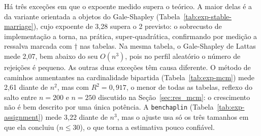 



Há três exceções em que o expoente medido supera o teórico. A maior delas é a da
variante orientada a objetos do Gale-Shapley
(Tabela~\ref{tab:exp-stable-marriage}), cujo expoente de 3{,}28 supera o 2
previsto: o sobrecusto de implementação a torna, na prática, super-quadrática,
confirmando por medição a ressalva marcada com † nas tabelas. Na mesma tabela, o
Gale-Shapley de Lattas mede 2{,}07, bem abaixo do seu $O(n^3)$, pois no perfil
aleatório o número de rejeições é pequeno. As outras duas exceções têm causa
diferente. O método de caminhos aumentantes na cardinalidade bipartida
(Tabela~\ref{tab:exp-mcm}) mede 2{,}61 diante de $n^2$, mas com $R^2 = 0{,}917$, o
menor de todas as tabelas, reflexo do salto entre $n = 200$ e $n = 250$ discutido
na Seção~\ref{sec:res_mcm}: o crescimento não é bem descrito por uma única potência.
A \texttt{benchaplin} (Tabela~\ref{tab:exp-assignment}) mede 3{,}22 diante de
$n^3$, mas o ajuste usa só os três tamanhos em que ela concluiu ($n \le 30$), o que
torna a estimativa pouco confiável.
